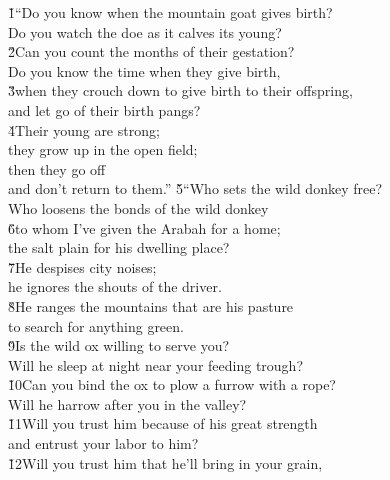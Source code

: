 \begin{poetry}
\poeml {}
\v{1}``Do you know when the mountain goat gives birth? \\
\poemll    Do you watch the doe as it calves its young? \\
\poeml \v{2}Can you count the months of their gestation? \\
\poemll    Do you know the time when they give birth, \\
\poeml \v{3}when they crouch down to give birth to their offspring, \\
\poemll    and let go of their birth pangs? \\
\poeml \v{4}Their young are strong; \\
\poemll    they grow up in the open field; \\
\poeml then they go off \\
\poemll    and don't return to them.''
\poeml \v{5}``Who sets the wild donkey free? \\
\poemll    Who loosens the bonds of the wild donkey \\
\poeml \v{6}to whom I've given the Arabah for a home; \\
\poemll    the salt plain for his dwelling place? \\
\poeml \v{7}He despises city noises; \\
\poemll    he ignores the shouts of the driver. \\
\poeml \v{8}He ranges the mountains that are his pasture \\
\poemll    to search for anything green. \\
\poeml \v{9}Is the wild ox willing to serve you? \\
\poemll    Will he sleep at night near your feeding trough? \\
\poeml \v{10}Can you bind the ox to plow a furrow with a rope? \\
\poemll    Will he harrow after you in the valley? \\
\poeml \v{11}Will you trust him because of his great strength \\
\poemll    and entrust your labor to him? \\
\poeml \v{12}Will you trust him that he'll bring in your grain, \\

\end{poetry}
